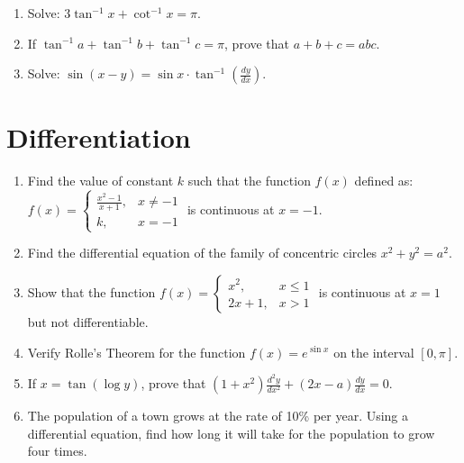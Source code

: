 \documentclass[a4paper,12pt]{article}
\begin{document}
\begin{enumerate}

		\item Solve: $3 \tan^{-1}x + \cot^{-1}x = \pi$.
		\item If $\tan^{-1}a + \tan^{-1}b + \tan^{-1}c = \pi$, prove that $a + b + c = abc$.
	\item Solve: $\sin(x - y) = \sin x \cdot \tan^{-1}\left(\frac{dy}{dx}\right)$.
\end{enumerate}


\section{Differentiation}

\begin{enumerate}

		\item Find the value of constant $k$ such that the function $f(x)$ defined as:
        $ f(x) = \begin{cases} \frac{x^2 - 1}{x + 1}, & x \neq -1 \\ k, & x = -1 \end{cases} $
        is continuous at $x = -1$.
		\item Find the differential equation of the family of concentric circles $x^2 + y^2 = a^2$.
        \item Show that the function
        $ f(x) = \begin{cases} x^2, & x \leq 1 \\ 2x + 1, & x > 1 \end{cases} $
        is continuous at $x = 1$ but not differentiable.
        \item Verify Rolle's Theorem for the function $f(x) = e^{\sin x}$ on the interval $[0, \pi]$.
   
    \item
    If $x = \tan(\log y)$, prove that $(1 + x^2) \frac{d^2y}{dx^2} + (2x - a) \frac{dy}{dx} = 0$.
\item The population of a town grows at the rate of 10\% per year. Using a differential equation, find how long it will take for the population to grow four times.

\end{enumerate}
\end{document}
